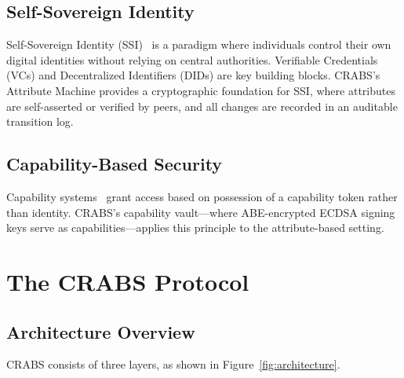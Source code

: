 \documentclass[sigconf,nonacm]{acmart}
\newcommand{\crab}{\textsc{CRABS}}
\begin{document}
\subsection{Self-Sovereign Identity}

Self-Sovereign Identity (SSI)~\cite{allen2016ssi} is a paradigm where individuals control their own digital identities without relying on central authorities. Verifiable Credentials (VCs) and Decentralized Identifiers (DIDs) are key building blocks. \crab{}'s Attribute Machine provides a cryptographic foundation for SSI, where attributes are self-asserted or verified by peers, and all changes are recorded in an auditable transition log.

\subsection{Capability-Based Security}

Capability systems~\cite{dennis1966capability} grant access based on possession of a capability token rather than identity. \crab{}'s capability vault---where ABE-encrypted ECDSA signing keys serve as capabilities---applies this principle to the attribute-based setting.

\section{The \crab{} Protocol}

\subsection{Architecture Overview}

\crab{} consists of three layers, as shown in Figure~\ref{fig:architecture}.
\end{document}
